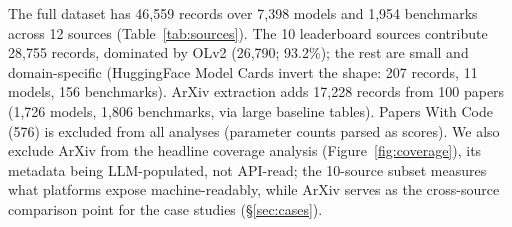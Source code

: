 \documentclass[11pt]{article}
\begin{document}
%
%


The full dataset has 46{,}559 records over 7{,}398 models and 1{,}954 benchmarks
across 12 sources (Table~\ref{tab:sources}). The 10 leaderboard sources contribute
28{,}755 records, dominated by OLv2 (26{,}790; 93.2\%); the rest are small and
domain-specific (HuggingFace Model Cards invert the shape: 207 records, 11
models, 156 benchmarks). ArXiv extraction adds 17{,}228 records from 100 papers
(1{,}726 models, 1{,}806 benchmarks, via large baseline tables). Papers With Code
(576) is excluded from all analyses (parameter counts parsed as scores). We also
exclude ArXiv from the headline coverage analysis (Figure~\ref{fig:coverage}),
its metadata being LLM-populated, not API-read; the 10-source subset measures
what platforms expose machine-readably, while ArXiv serves as the cross-source
comparison point for the case studies (\S\ref{sec:cases}).
\end{document}
